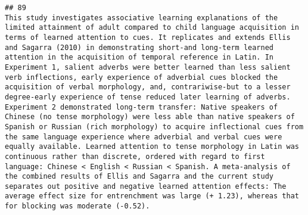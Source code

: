 \documentclass[
  english,
  man]{apa6}
\begin{document}
\begin{verbatim}
## 89                                                                                                                                                                                                                                                                                                                                                                                                                                                                                                                                                                                                                                                                                                                                                                                                                                                                                                                                                                                                                                                                                                                                                                                                                                                                                                                This study investigates associative learning explanations of the limited attainment of adult compared to child language acquisition in terms of learned attention to cues. It replicates and extends Ellis and Sagarra (2010) in demonstrating short-and long-term learned attention in the acquisition of temporal reference in Latin. In Experiment 1, salient adverbs were better learned than less salient verb inflections, early experience of adverbial cues blocked the acquisition of verbal morphology, and, contrariwise-but to a lesser degree-early experience of tense reduced later learning of adverbs. Experiment 2 demonstrated long-term transfer: Native speakers of Chinese (no tense morphology) were less able than native speakers of Spanish or Russian (rich morphology) to acquire inflectional cues from the same language experience where adverbial and verbal cues were equally available. Learned attention to tense morphology in Latin was continuous rather than discrete, ordered with regard to first language: Chinese < English < Russian < Spanish. A meta-analysis of the combined results of Ellis and Sagarra and the current study separates out positive and negative learned attention effects: The average effect size for entrenchment was large (+ 1.23), whereas that for blocking was moderate (-0.52).

\end{verbatim}
\end{document}
